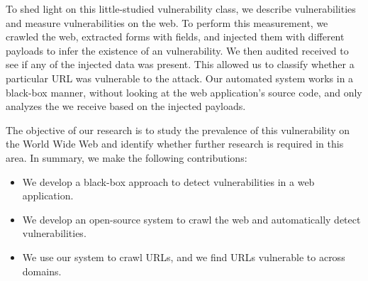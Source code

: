 To shed light on this little-studied vulnerability class, we describe \ehi vulnerabilities and measure \ehi vulnerabilities on the web. To perform this measurement, we crawled the web, extracted forms with \email fields, and injected them with different payloads to infer the existence of an \ehi vulnerability. We then audited received \emails to see if any of the injected data was present. This allowed us to classify whether a particular URL was vulnerable to the attack. Our automated system works in a black-box manner, without looking at the web application's source code, and only analyzes the \emails we receive based on the injected payloads.

The objective of our research is to study the prevalence of this vulnerability on the World Wide Web and identify whether further research is required in this area.
In summary, we make the following contributions:
\begin{itemize}

\item We develop a black-box approach to detect \ehi vulnerabilities in a web application.

\item We develop an open-source system to crawl the web and automatically detect \ehi vulnerabilities.

\item We use our system to crawl \urls URLs, and we find \success URLs vulnerable to \ehi across \domains domains. 

\end{itemize}
